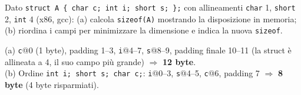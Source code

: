 \question[6]
Dato \lstinline|struct A { char c; int i; short s; };| con allineamenti \lstinline|char| 1, \lstinline|short| 2, \lstinline|int| 4 (x86, gcc):
(a) calcola \lstinline|sizeof(A)| mostrando la disposizione in memoria; (b) riordina i campi per minimizzare la dimensione e indica la nuova \lstinline|sizeof|.
\begin{solution}
(a) \lstinline|c|@0 (1 byte), padding 1--3, \lstinline|i|@4--7, \lstinline|s|@8--9, padding finale 10--11 (la struct è allineata a 4, il suo campo più grande) $\Rightarrow$ \textbf{12 byte}.\\
(b) Ordine \lstinline|int i; short s; char c;|: \lstinline|i|@0--3, \lstinline|s|@4--5, \lstinline|c|@6, padding 7 $\Rightarrow$ \textbf{8 byte} (4 byte risparmiati).
\end{solution}
